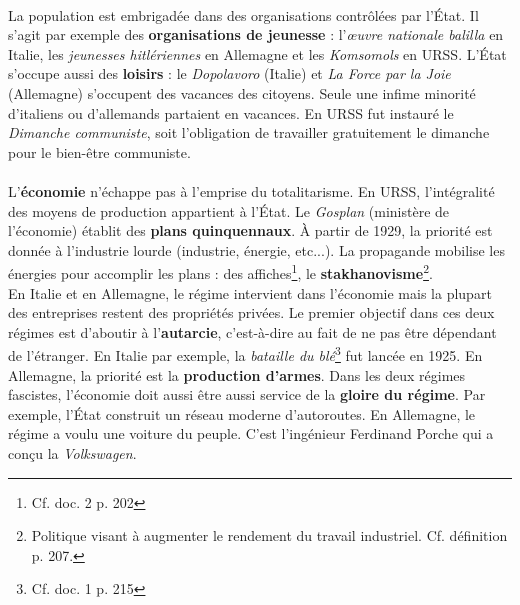 \documentclass[12pt]{article}
\renewcommand{\emph}{\textbf}
\begin{document}
\paragraph{}
La population est embrigadée dans des organisations contrôlées par l'État. Il s'agit par exemple des \emph{organisations de jeunesse} : l'\textit{œuvre nationale balilla} en Italie, les \textit{jeunesses hitlériennes} en Allemagne et les \textit{Komsomols} en URSS. L'État s'occupe aussi des \emph{loisirs} : le \textit{Dopolavoro} (Italie) et \textit{La Force par la Joie} (Allemagne) s'occupent des vacances des citoyens. Seule une infime minorité d'italiens ou d'allemands partaient en vacances. En URSS fut instauré le \textit{Dimanche communiste}, soit l'obligation de travailler gratuitement le dimanche pour le bien-être communiste.

\paragraph{}
L'\emph{économie} n'échappe pas à l'emprise du totalitarisme. En URSS, l'intégralité des moyens de production appartient à l'État. Le \textit{Gosplan} (ministère de l'économie) établit des \emph{plans quinquennaux}. À partir de 1929, la priorité est donnée à l'industrie lourde (industrie, énergie, etc...). La propagande mobilise les énergies pour accomplir les plans : des affiches\footnote{Cf. doc. 2 p. 202}, le \emph{stakhanovisme}\footnote{Politique visant à augmenter le rendement du travail industriel. Cf. définition p. 207.}.\\
En Italie et en Allemagne, le régime intervient dans l'économie mais la plupart des entreprises restent des propriétés privées. Le premier objectif dans ces deux régimes est d'aboutir à l'\emph{autarcie}, c'est-à-dire au fait de ne pas être dépendant de l'étranger. En Italie par exemple, la \textit{bataille du blé}\footnote{Cf. doc. 1 p. 215} fut lancée en 1925. En Allemagne, la priorité est la \emph{production d'armes}. Dans les deux régimes fascistes, l'économie doit aussi être aussi service de la \emph{gloire du régime}. Par exemple, l'État construit un réseau moderne d'autoroutes. En Allemagne, le régime a voulu une voiture du peuple. C'est l'ingénieur Ferdinand Porche qui a conçu la \textit{Volkswagen}.
\end{document}
